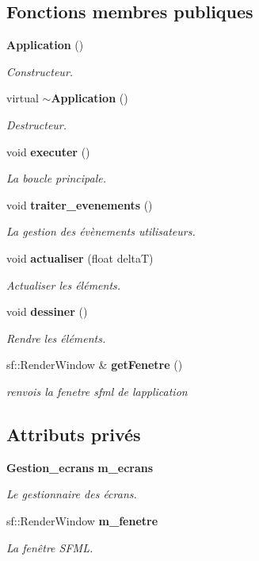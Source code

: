 \subsection*{Fonctions membres publiques}
\begin{DoxyCompactItemize}
\item 
{\bf Application} ()
\begin{DoxyCompactList}\small\item\em Constructeur. \end{DoxyCompactList}\item 
virtual {\bf $\sim$\+Application} ()
\begin{DoxyCompactList}\small\item\em Destructeur. \end{DoxyCompactList}\item 
void {\bf executer} ()
\begin{DoxyCompactList}\small\item\em La boucle principale. \end{DoxyCompactList}\item 
void {\bf traiter\+\_\+evenements} ()
\begin{DoxyCompactList}\small\item\em La gestion des évènements utilisateurs. \end{DoxyCompactList}\item 
void {\bf actualiser} (float delta\+T)
\begin{DoxyCompactList}\small\item\em Actualiser les éléments. \end{DoxyCompactList}\item 
void {\bf dessiner} ()
\begin{DoxyCompactList}\small\item\em Rendre les éléments. \end{DoxyCompactList}\item 
sf\+::\+Render\+Window \& {\bf get\+Fenetre} ()
\begin{DoxyCompactList}\small\item\em renvois la fenetre sfml de l\textquotesingle{}application \end{DoxyCompactList}\end{DoxyCompactItemize}
\subsection*{Attributs privés}
\begin{DoxyCompactItemize}
\item 
{\bf Gestion\+\_\+ecrans} {\bf m\+\_\+ecrans}
\begin{DoxyCompactList}\small\item\em Le gestionnaire des écrans. \end{DoxyCompactList}\item 
sf\+::\+Render\+Window {\bf m\+\_\+fenetre}
\begin{DoxyCompactList}\small\item\em La fenêtre S\+F\+M\+L. \end{DoxyCompactList}\end{DoxyCompactItemize}


